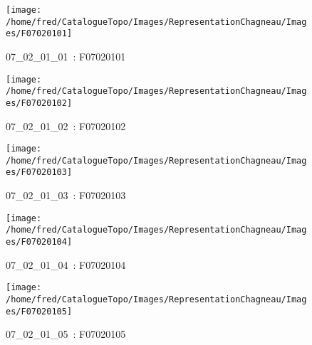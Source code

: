 \documentclass[12pt,titlepage,oneside]{book}
\begin{document}
\begin{figure}[h!]
  \hfill         %
  \begin{minipage}[t]{3cm}
    \begin{center}
      \texttt{[image: /home/fred/CatalogueTopo/Images/RepresentationChagneau/Images/F07020101]}
      \caption[~07\_02\_01\_01]{\small{07\_02\_01\_01~:} \tiny{F07020101}}\label{F07020101}
    \end{center}
  \end{minipage}
  \begin{minipage}[t]{3cm}
    \begin{center}
      \texttt{[image: /home/fred/CatalogueTopo/Images/RepresentationChagneau/Images/F07020102]}
      \caption[~07\_02\_01\_02]{\small{07\_02\_01\_02~:} \tiny{F07020102}}\label{F07020102}
    \end{center}
  \end{minipage}
  \begin{minipage}[t]{3cm}
    \begin{center}
      \texttt{[image: /home/fred/CatalogueTopo/Images/RepresentationChagneau/Images/F07020103]}
      \caption[~07\_02\_01\_03]{\small{07\_02\_01\_03~:} \tiny{F07020103}}\label{F07020103}
    \end{center}
  \end{minipage}
  \begin{minipage}[t]{3cm}
    \begin{center}
      \texttt{[image: /home/fred/CatalogueTopo/Images/RepresentationChagneau/Images/F07020104]}
      \caption[~07\_02\_01\_04]{\small{07\_02\_01\_04~:} \tiny{F07020104}}\label{F07020104}
    \end{center}
  \end{minipage}
  \begin{minipage}[t]{3cm}
    \begin{center}
      \texttt{[image: /home/fred/CatalogueTopo/Images/RepresentationChagneau/Images/F07020105]}
      \caption[~07\_02\_01\_05]{\small{07\_02\_01\_05~:} \tiny{F07020105}}\label{F07020105}
    \end{center}
  \end{minipage}
\end{figure}
\end{document}
